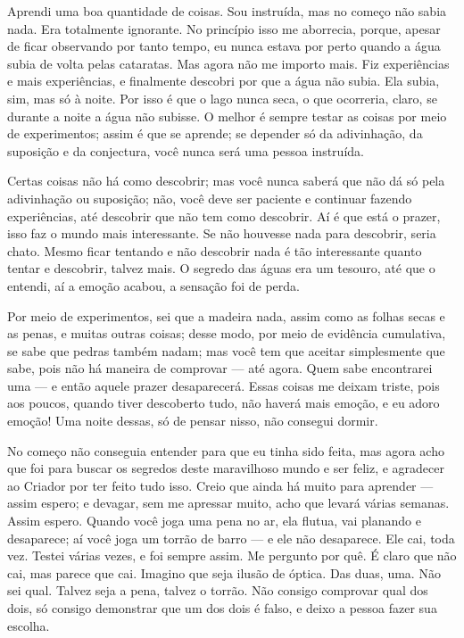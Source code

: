 Aprendi uma boa quantidade de coisas. Sou instruída, mas no começo não sabia nada.
Era totalmente ignorante. No princípio isso me aborrecia, porque, apesar de
ficar observando por tanto tempo, eu nunca estava por perto quando a água subia de
volta pelas cataratas. Mas agora não me importo mais. Fiz experiências e mais
experiências, e finalmente descobri por que a água não subia. Ela subia,
sim, mas só à noite. Por isso é que o lago nunca seca, o que ocorreria, claro,
se durante a noite a água não subisse. O melhor é sempre testar as coisas por
meio de experimentos; assim é que se aprende; se depender só da
adivinhação, da suposição e da conjectura, você nunca será uma pessoa instruída.

Certas coisas não há como descobrir; mas você nunca saberá que não dá
só pela adivinhação ou suposição; não, você deve ser paciente e continuar
fazendo experiências, até descobrir que não tem como descobrir. Aí é que
está o prazer, isso faz o mundo mais interessante. Se não houvesse nada para
descobrir, seria chato. Mesmo ficar tentando e não descobrir nada é tão
interessante quanto tentar e descobrir, talvez mais. O segredo das águas
era um tesouro, até que o entendi, aí a emoção acabou, a sensação foi de
perda.

Por meio de experimentos, sei que a madeira nada, assim como as folhas secas e as
penas, e muitas outras coisas; desse modo, por meio de evidência cumulativa, se
sabe que pedras também nadam; mas você tem que aceitar simplesmente que sabe,
pois não há maneira de comprovar --- até agora. Quem sabe encontrarei uma --- e
então aquele prazer desaparecerá. Essas coisas me deixam triste, pois aos
poucos, quando tiver descoberto tudo, não haverá mais emoção, e eu adoro
emoção! Uma noite dessas, só de pensar nisso, não consegui dormir.

No começo não conseguia entender para que eu tinha sido feita, mas agora acho
que foi para buscar os segredos deste maravilhoso mundo e ser feliz, e
agradecer ao Criador por ter feito tudo isso. Creio que ainda há muito para
aprender --- assim espero; e devagar, sem me apressar muito, acho que levará 
várias semanas. Assim espero. Quando você joga uma pena no ar, ela flutua,
vai planando e desaparece; aí você joga um torrão de barro --- e ele não
desaparece. Ele cai, toda vez. Testei várias vezes, e foi sempre assim. Me
pergunto por quê. É claro que não cai, mas parece que cai. Imagino que seja
ilusão de óptica. Das duas, uma. Não sei qual. Talvez seja a pena, talvez o
torrão. Não consigo comprovar qual dos dois, só consigo demonstrar que um
dos dois é falso, e deixo a pessoa fazer sua escolha.

